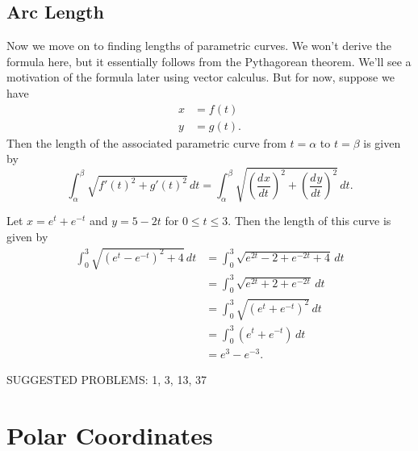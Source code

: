 \documentclass[10pt,]{book}
\theoremstyle{ptxplainnotitle}
\theoremstyle{ptxplaintitle}
\theoremstyle{ptxplainnotitle}
\theoremstyle{ptxplaintitle}
\theoremstyle{ptxplainnotitle}
\theoremstyle{ptxplaintitle}
\theoremstyle{ptxdefinitionnotitle}
\theoremstyle{ptxdefinitiontitle}
\theoremstyle{ptxdefinitionnotitle}
\theoremstyle{ptxdefinitiontitle}
\theoremstyle{ptxdefinitionnotitle}
\theoremstyle{ptxdefinitiontitle}
\theoremstyle{ptxdefinitionnotitle}
\theoremstyle{ptxdefinitiontitle}
\theoremstyle{ptxdefinitionnotitle}
\theoremstyle{ptxdefinitiontitle}
\numberwithin{equation}{section}
\newcommand{\dv}[3][]{\dfrac{d^{#1} #2}{d #3^{#1}}}
\begin{document}
\subsection[{Arc Length}]{Arc Length}\label{subsection-arc-length}
\hypertarget{p-667}{}%
Now we move on to finding lengths of parametric curves. We won't derive the formula here, but it essentially follows from the Pythagorean theorem. We'll see a motivation of the formula later using vector calculus. But for now, suppose we have%
%
\begin{align*}
x & = f(t) \\
y & = g(t). 
\end{align*}
\hypertarget{p-668}{}%
Then the length of the associated parametric curve from \(t=\alpha\) to \(t=\beta\) is given by%
%
\begin{equation*}
\int_{\alpha}^{\beta} \sqrt{f'(t)^{2}+g'(t)^{2}}\,dt = \int_{\alpha}^{\beta}\sqrt{\left(\dv{x}{t}\right)^{2} + \left(\dv{y}{t}\right)^{2}}\,dt.
\end{equation*}
\begin{example}\label{example-arc-length-of-a-parametric-curve}
\hypertarget{p-669}{}%
Let \(x = e^{t}+e^{-t}\) and \(y = 5-2t\) for \(0\leq t\leq 3.\) Then the length of this curve is given by%
%
\begin{align*}
\int_{0}^{3}\sqrt{(e^{t}-e^{-t})^{2} + 4}\,dt & = \int_{0}^{3}\sqrt{e^{2t}-2 + e^{-2t} + 4}\,dt \\
& = \int_{0}^{3}\sqrt{e^{2t} + 2 + e^{-2t}}\,dt \\
& = \int_{0}^{3}\sqrt{(e^{t}+e^{-t})^{2}}\,dt \\
& = \int_{0}^{3}(e^{t}+e^{-t})\,dt\\
& = e^{3}-e^{-3}.
\end{align*}
\end{example}
\hypertarget{p-670}{}%
SUGGESTED PROBLEMS: 1, 3, 13, 37%
\typeout{************************************************}
\typeout{************************************************}
\section[{Polar Coordinates}]{Polar Coordinates}\label{section-polar-coordinates}
\typeout{************************************************}
\typeout{************************************************}
\end{document}
